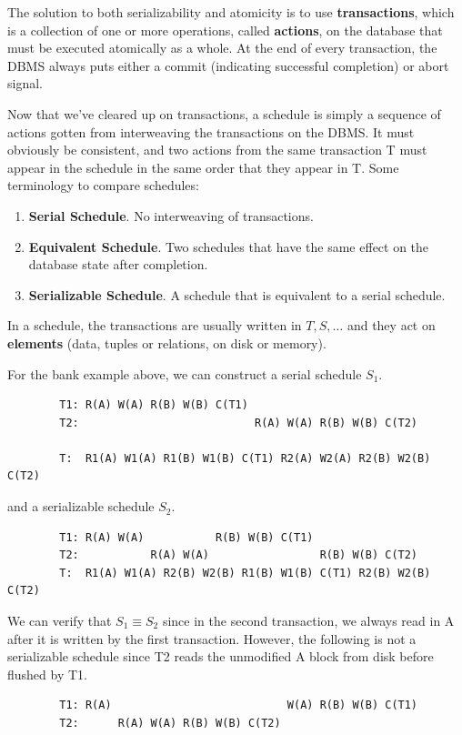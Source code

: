\documentclass{article}
\begin{document}
    \begin{definition}[Transaction]
      The solution to both serializability and atomicity is to use \textbf{transactions}, which is a collection of one or more operations, called \textbf{actions}, on the database that must be executed atomically as a whole. At the end of every transaction, the DBMS always puts either a commit (indicating successful completion) or abort signal. 
    \end{definition} 

    \begin{definition}[Schedule]
      Now that we've cleared up on transactions, a schedule is simply a sequence of actions gotten from interweaving the transactions on the DBMS. It must obviously be consistent, and two actions from the same transaction T must appear in the schedule in the same order that they appear in T. Some terminology to compare schedules: 
      \begin{enumerate}
        \item \textbf{Serial Schedule}. No interweaving of transactions. 
        \item \textbf{Equivalent Schedule}. Two schedules that have the same effect on the database state after completion. 
        \item \textbf{Serializable Schedule}. A schedule that is equivalent to a serial schedule. 
      \end{enumerate}
      In a schedule, the transactions are usually written in $T, S, \ldots$ and they act on \textbf{elements} (data, tuples or relations, on disk or memory). 
    \end{definition}

    \begin{example}
      For the bank example above, we can construct a serial schedule $S_1$. 
      \begin{lstlisting}
        T1: R(A) W(A) R(B) W(B) C(T1)
        T2:                           R(A) W(A) R(B) W(B) C(T2)

        T:  R1(A) W1(A) R1(B) W1(B) C(T1) R2(A) W2(A) R2(B) W2(B) C(T2)
      \end{lstlisting}
      and a serializable schedule $S_2$. 
      \begin{lstlisting}
        T1: R(A) W(A)           R(B) W(B) C(T1) 
        T2:           R(A) W(A)                 R(B) W(B) C(T2)
        T:  R1(A) W1(A) R2(B) W2(B) R1(B) W1(B) C(T1) R2(B) W2(B) C(T2)
      \end{lstlisting}
      We can verify that $S_1 \equiv S_2$ since in the second transaction, we always read in A after it is written by the first transaction. However, the following is not a serializable schedule since T2 reads the unmodified A block from disk before flushed by T1.  
      \begin{lstlisting}
        T1: R(A)                           W(A) R(B) W(B) C(T1)
        T2:      R(A) W(A) R(B) W(B) C(T2)
      \end{lstlisting}
    \end{example} 
\end{document}
